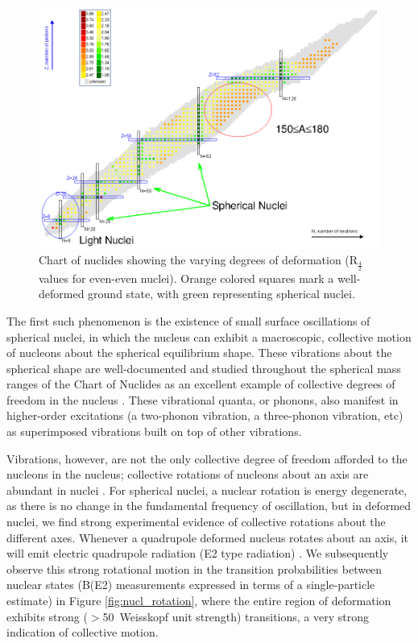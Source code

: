 \begin{figure}[h!] 
\begin{center}
\includegraphics[width=\textwidth]{figures/Chart_of_Nuclides_def.eps}
\caption{Chart of nuclides showing the varying degrees of deformation (R$_\frac{4}{2}$ values for even-even nuclei). Orange colored squares mark a well-deformed ground state, with green representing spherical nuclei.}
\label{fig:chart_nuclides}
\end{center}
\end{figure}

The first such phenomenon is the existence of small surface oscillations of spherical nuclei, in which the nucleus can exhibit a macroscopic, collective motion of nucleons about the spherical equilibrium shape. These vibrations about the spherical shape are well-documented and studied throughout the spherical mass ranges of the Chart of Nuclides as an excellent example of collective degrees of freedom in the nucleus \cite{Casten_text,Aprahamian_118Cd}. These vibrational quanta, or phonons, also manifest in higher-order excitations (a two-phonon vibration, a three-phonon vibration, etc) as superimposed vibrations built on top of other vibrations.

Vibrations, however, are not the only collective degree of freedom afforded to the nucleons in the nucleus; collective rotations of nucleons about an axis are abundant in nuclei \cite{Casten_text,Wong_text}. For spherical nuclei, a nuclear rotation is energy degenerate, as there is no change in the fundamental frequency of oscillation, but in deformed nuclei, we find strong experimental evidence of collective rotations about the different axes. Whenever a quadrupole deformed nucleus rotates about an axis, it will emit electric quadrupole radiation (E2 type radiation) \cite{Rowe_Wood_text}. We subsequently observe this strong rotational motion in the transition probabilities between nuclear states (B(E2) measurements expressed in terms of a single-particle estimate) in Figure \ref{fig:nucl_rotation}, where the entire region of deformation exhibits strong ($>$50~Weisskopf unit strength) transitions, a very strong indication of collective motion.


